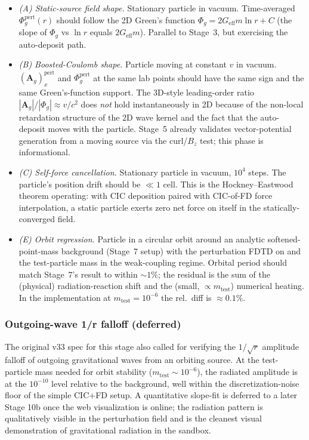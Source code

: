 \documentclass[11pt,a4paper]{article}
\newcommand{\vv}[1]{\mathbf{#1}}
\newcommand{\Phig}{\Phi_g}
\newcommand{\Ag}{\vv{A}_g}
\begin{document}
\begin{itemize}
  \item \emph{(A) Static-source field shape.}  Stationary particle in
        vacuum.  Time-averaged $\Phig^{\mathrm{pert}}(r)$ should follow
        the 2D Green's function $\Phig = 2 G_{\mathrm{eff}} m \ln r + C$
        (the slope of $\Phig$ vs $\ln r$ equals $2 G_{\mathrm{eff}} m$).
        Parallel to Stage~3, but exercising the auto-deposit path.
  \item \emph{(B) Boosted-Coulomb shape.}  Particle moving at constant
        $v$ in vacuum.  $(\Ag)^{\mathrm{pert}}_x$ and
        $\Phig^{\mathrm{pert}}$ at the same lab points should have the
        same sign and the same Green's-function support.  The 3D-style
        leading-order ratio $|\Ag|/|\Phig| \approx v/c^2$ does
        \emph{not} hold instantaneously in 2D because of the non-local
        retardation structure of the 2D wave kernel and the fact that
        the auto-deposit moves with the particle.  Stage~5 already
        validates vector-potential generation from a moving source via
        the curl/$B_z$ test; this phase is informational.
  \item \emph{(C) Self-force cancellation.}  Stationary particle in
        vacuum, $10^4$ steps.  The particle's position drift should be
        $\ll 1$ cell.  This is the Hockney--Eastwood theorem operating:
        with CIC deposition paired with CIC-of-FD force interpolation,
        a static particle exerts zero net force on itself in the
        statically-converged field.
  \item \emph{(E) Orbit regression.}  Particle in a circular orbit
        around an analytic softened-point-mass background (Stage~7
        setup) with the perturbation FDTD on and the test-particle
        mass in the weak-coupling regime.  Orbital period should match
        Stage~7's result to within $\sim 1\%$; the residual is the
        sum of the (physical) radiation-reaction shift and the (small,
        $\propto m_{\mathrm{test}}$) numerical heating.  In the
        implementation at $m_{\mathrm{test}} = 10^{-6}$ the rel.\ diff
        is $\approx 0.1\%$.
\end{itemize}

\subsubsection*{Outgoing-wave 1/\textsurd{}r falloff (deferred)}

The original v33 spec for this stage also called for verifying the
$1/\sqrt{r}$ amplitude falloff of outgoing gravitational waves from an
orbiting source.  At the test-particle mass needed for orbit stability
($m_{\mathrm{test}} \sim 10^{-6}$), the radiated amplitude is at the
$10^{-10}$ level relative to the background, well within the
discretization-noise floor of the simple CIC$+$FD setup.  A
quantitative slope-fit is deferred to a later Stage 10b once the web
visualization is online; the radiation pattern is qualitatively visible
in the perturbation field and is the cleanest visual demonstration of
gravitational radiation in the sandbox.
\end{document}
